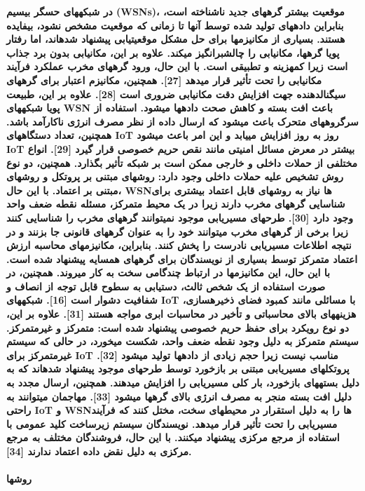 \documentclass{article} %
\begin{document}
\noindent 
{\bf در شبکههای حسگر بیسیم (WSNs)، موقعیت بیشتر گرههای جدید ناشناخته است، بنابراین دادههای تولید شده توسط آنها تا زمانی که موقعیت مشخص نشود، بیفایده هستند. بسیاری از مکانیزمها برای حل مشکل موقعیتیابی پیشنهاد شدهاند، اما رفتار پویا گرهها، مکانیابی را چالشبرانگیز میکند. علاوه بر این، مکانیابی بدون برد جذاب است زیرا کمهزینه و تطبیقی است. با این حال، ورود گرههای مخرب عملکرد فرآیند مکانیابی را تحت تأثیر قرار میدهد [27]. همچنین، مکانیزم اعتبار برای گرههای سیگنالدهنده جهت افزایش دقت مکانیابی ضروری است [28]. علاوه بر این، طبیعت پویا شبکههای WSN باعث افت بسته و کاهش صحت دادهها میشود. استفاده از سرگروههای متحرک باعث میشود که ارسال داده از نظر مصرف انرژی ناکارآمد باشد. همچنین، تعداد دستگاههای IoT روز به روز افزایش مییابد و این امر باعث میشود IoT بیشتر در معرض مسائل امنیتی مانند نقص حریم خصوصی قرار گیرد [29]. انواع مختلفی از حملات داخلی و خارجی ممکن است بر شبکه تأثیر بگذارد. همچنین، دو نوع روش تشخیص علیه حملات داخلی وجود دارد: روشهای مبتنی بر پروتکل و روشهای مبتنی بر اعتماد. با این حال، WSNها نیاز به روشهای قابل اعتماد بیشتری برای شناسایی گرههای مخرب دارند زیرا در یک محیط متمرکز، مسئله نقطه ضعف واحد وجود دارد [30]. طرحهای مسیریابی موجود نمیتوانند گرههای مخرب را شناسایی کنند زیرا برخی از گرههای مخرب میتوانند خود را به عنوان گرههای قانونی جا بزنند و در نتیجه اطلاعات مسیریابی نادرست را پخش کنند. بنابراین، مکانیزمهای محاسبه ارزش اعتماد متمرکز توسط بسیاری از نویسندگان برای گرههای همسایه پیشنهاد شده است. با این حال، این مکانیزمها در ارتباط چندگامی سخت به کار میروند. همچنین، در صورت استفاده از یک شخص ثالث، دستیابی به سطوح قابل توجه از انصاف و شفافیت دشوار است [16]. شبکههای IoT با مسائلی مانند کمبود فضای ذخیرهسازی، هزینههای بالای محاسباتی و تأخیر در محاسبات ابری مواجه هستند [31]. علاوه بر این، دو نوع رویکرد برای حفظ حریم خصوصی پیشنهاد شده است: متمرکز و غیرمتمرکز. سیستم متمرکز به دلیل وجود نقطه ضعف واحد، شکست میخورد، در حالی که سیستم غیرمتمرکز برای IoT مناسب نیست زیرا حجم زیادی از دادهها تولید میشود [32]. پروتکلهای مسیریابی مبتنی بر بازخورد توسط طرحهای موجود پیشنهاد شدهاند که به دلیل بستههای بازخورد، بار کلی مسیریابی را افزایش میدهند. همچنین، ارسال مجدد به دلیل افت بسته منجر به مصرف انرژی بالای گرهها میشود [33]. مهاجمان میتوانند به راحتی IoT و WSNها را به دلیل استقرار در محیطهای سخت، مختل کنند که فرآیند مسیریابی را تحت تأثیر قرار میدهد. نویسندگان سیستم زیرساخت کلید عمومی با استفاده از مرجع مرکزی پیشنهاد میکنند. با این حال، فروشندگان مختلف به مرجع مرکزی به دلیل نقض داده اعتماد ندارند [34].}


\paragraph{ روشها}
\end{document}
